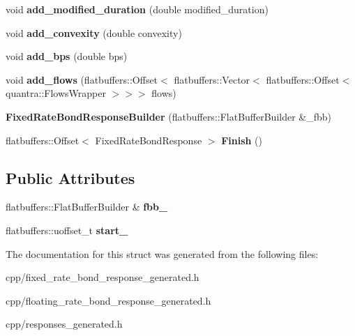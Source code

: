 \begin{DoxyCompactItemize}
void {\bfseries add\+\_\+modified\+\_\+duration} (double modified\+\_\+duration)
\item 
\mbox{\label{structquantra_1_1FixedRateBondResponseBuilder_a06475e4a933d653bbfcec17eab0ef7ad}} 
void {\bfseries add\+\_\+convexity} (double convexity)
\item 
\mbox{\label{structquantra_1_1FixedRateBondResponseBuilder_a9835cc69e13ffbab509db118c2d383ac}} 
void {\bfseries add\+\_\+bps} (double bps)
\item 
\mbox{\label{structquantra_1_1FixedRateBondResponseBuilder_a20ff7251a9c41fbbc05b3fa4770c1682}} 
void {\bfseries add\+\_\+flows} (flatbuffers\+::\+Offset$<$ flatbuffers\+::\+Vector$<$ flatbuffers\+::\+Offset$<$ quantra\+::\+Flows\+Wrapper $>$$>$$>$ flows)
\item 
\mbox{\label{structquantra_1_1FixedRateBondResponseBuilder_a0c6b61947b183f68ec0fb65453f47edd}} 
{\bfseries Fixed\+Rate\+Bond\+Response\+Builder} (flatbuffers\+::\+Flat\+Buffer\+Builder \&\+\_\+fbb)
\item 
\mbox{\label{structquantra_1_1FixedRateBondResponseBuilder_a7ea1076cb7eb9be4affd1354dee89e91}} 
flatbuffers\+::\+Offset$<$ Fixed\+Rate\+Bond\+Response $>$ {\bfseries Finish} ()
\end{DoxyCompactItemize}
\subsection*{Public Attributes}
\begin{DoxyCompactItemize}
\item 
\mbox{\label{structquantra_1_1FixedRateBondResponseBuilder_a15b933fe4ac089b711cbf5898f47db18}} 
flatbuffers\+::\+Flat\+Buffer\+Builder \& {\bfseries fbb\+\_\+}
\item 
\mbox{\label{structquantra_1_1FixedRateBondResponseBuilder_a5d382c516f0039c5ec4d734de5fe98fb}} 
flatbuffers\+::uoffset\+\_\+t {\bfseries start\+\_\+}
\end{DoxyCompactItemize}


The documentation for this struct was generated from the following files\+:\begin{DoxyCompactItemize}
\item 
cpp/fixed\+\_\+rate\+\_\+bond\+\_\+response\+\_\+generated.\+h\item 
cpp/floating\+\_\+rate\+\_\+bond\+\_\+response\+\_\+generated.\+h\item 
cpp/responses\+\_\+generated.\+h\end{DoxyCompactItemize}
